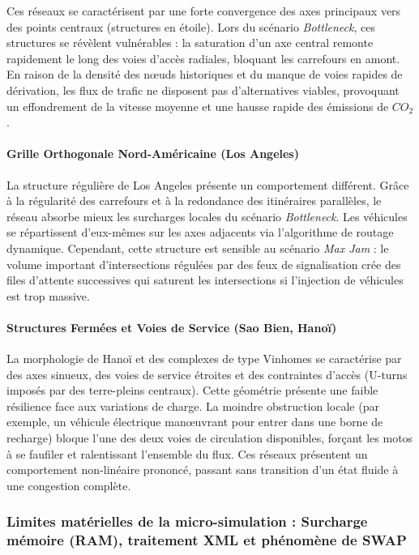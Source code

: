 \documentclass[11pt, a4paper]{article}
\begin{document}
Ces réseaux se caractérisent par une forte convergence des axes
principaux vers des points centraux (structures en étoile). Lors du
scénario \emph{Bottleneck}, ces structures se révèlent vulnérables : la
saturation d'un axe central remonte rapidement le long des voies d'accès
radiales, bloquant les carrefours en amont. En raison de la densité des
nœuds historiques et du manque de voies rapides de dérivation, les flux
de trafic ne disposent pas d'alternatives viables, provoquant un
effondrement de la vitesse moyenne et une hausse rapide des émissions de
\(CO_2\).

\paragraph{Grille Orthogonale Nord-Américaine (Los
Angeles)}\label{grille-orthogonale-nord-amuxe9ricaine-los-angeles}

La structure régulière de Los Angeles présente un comportement
différent. Grâce à la régularité des carrefours et à la redondance des
itinéraires parallèles, le réseau absorbe mieux les surcharges locales
du scénario \emph{Bottleneck}. Les véhicules se répartissent d'eux-mêmes
sur les axes adjacents via l'algorithme de routage dynamique. Cependant,
cette structure est sensible au scénario \emph{Max Jam} : le volume
important d'intersections régulées par des feux de signalisation crée
des files d'attente successives qui saturent les intersections si
l'injection de véhicules est trop massive.

\paragraph{Structures Fermées et Voies de Service (Sao Bien,
Hanoï)}\label{structures-fermuxe9es-et-voies-de-service-sao-bien-hanouxef}

La morphologie de Hanoï et des complexes de type Vinhomes se caractérise
par des axes sinueux, des voies de service étroites et des contraintes
d'accès (U-turns imposés par des terre-pleins centraux). Cette géométrie
présente une faible résilience face aux variations de charge. La moindre
obstruction locale (par exemple, un véhicule électrique manœuvrant pour
entrer dans une borne de recharge) bloque l'une des deux voies de
circulation disponibles, forçant les motos à se faufiler et ralentissant
l'ensemble du flux. Ces réseaux présentent un comportement non-linéaire
prononcé, passant sans transition d'un état fluide à une congestion
complète.

\subsubsection{Limites matérielles de la micro-simulation : Surcharge
mémoire (RAM), traitement XML et phénomène de
SWAP}\label{limites-matuxe9rielles-de-la-micro-simulation-surcharge-muxe9moire-ram-traitement-xml-et-phuxe9nomuxe8ne-de-swap}
\end{document}
